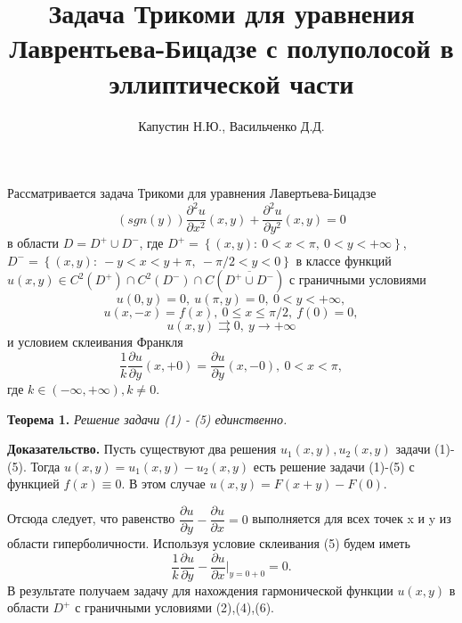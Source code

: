 \documentclass[14pt]{article}
\title{Задача Трикоми для уравнения Лаврентьева-Бицадзе с полуполосой в эллиптической части}
\author{Капустин Н.Ю., Васильченко Д.Д.}
\date{}
\begin{document}
	\maketitle
		\par
	Рассматривается задача Трикоми для уравнения Лавертьева-Бицадзе
	\begin{equation}
		\left(sgn (y)\right) \dfrac{\partial^2 u}{\partial x^2}(x,y) + \dfrac{\partial^2 u}{\partial y^2}(x,y) = 0
	\end{equation}
	в области $D = D^{+} \cup D^{-}$, где $D^{+} = \left\{(x,y): \ 0 < x < \pi, \ 0 < y < + \infty \right\}$, 
	 \newline$D^{-} = \left\{(x,y): \ -y < x < y + \pi, \ -\pi/2 < y < 0\right\}$ в классе функций $u(x,y) \in C^2(D^{+}) \cap C^2(D^{-}) \cap C(\overline{D^{+} \cup D^{-}})$ с граничными условиями
	\begin{equation}
		u(0,y) = 0, \ u(\pi, y) = 0, \ 0 < y < + \infty,
	\end{equation}
	\begin{equation}
		u(x,-x) = f(x) , \ 0 \leq x \leq \pi/2, \ f(0) = 0, 
	\end{equation}
	\begin{equation}
		u(x,y) \rightrightarrows 0, \ y \to +\infty
	\end{equation}
	и условием склеивания Франкля 
	\begin{equation}
		\dfrac1{k} \dfrac{\partial u}{\partial y}(x, +0) = \dfrac{\partial u}{\partial y} (x, -0), \ 0 < x < \pi, 
	\end{equation}
	где $k \in (-\infty, +\infty), k \neq 0$.
	\par
		\textbf{Теорема 1.} \textit{Решение задачи (1) - (5) единственно.}
		
	\textbf{Доказательство.} 
	Пусть существуют два решения $u_1(x,y), u_2(x,y)$ задачи (1)-(5). Тогда $u(x,y) = u_1(x,y) - u_2(x,y)$ есть решение задачи (1)-(5) с функцией $f(x) \equiv 0$. В этом случае $u(x,y) = F(x+y) - F(0)$.
	
	Отсюда следует, что равенство $\dfrac{\partial u}{\partial y} - \dfrac{\partial u}{\partial x} = 0$ выполняется для всех точек x и y из области гиперболичности. Используя условие склеивания  (5) будем иметь
	\begin{equation}
		\dfrac1{k} \dfrac{\partial u}{\partial y} - \dfrac{\partial u}{\partial x}\vert_{y=0+0} = 0.
	\end{equation}
	В результате получаем задачу для нахождения гармонической функции $u(x,y)$ в области $D^{+}$ с граничными условиями (2),(4),(6).
	
\end{document}
